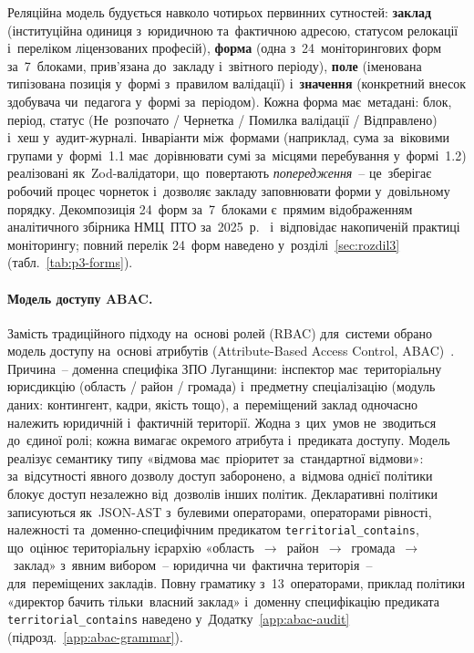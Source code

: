 Реляційна модель будується навколо чотирьох первинних сутностей: \textbf{заклад} (інституційна одиниця з~юридичною та~фактичною адресою, статусом релокації і~переліком ліцензованих професій), \textbf{форма} (одна з~24~моніторингових форм за~7~блоками, прив'язана до~закладу і~звітного періоду), \textbf{поле} (іменована типізована позиція у~формі з~правилом валідації) і~\textbf{значення} (конкретний внесок здобувача чи~педагога у~формі за~періодом). Кожна форма має~метадані: блок, період, статус (Не~розпочато / Чернетка / Помилка валідації / Відправлено) і~хеш у~аудит-журналі. Інваріанти між~формами (наприклад, сума за~віковими групами у~формі~1.1 має~дорівнювати сумі за~місцями перебування у~формі~1.2) реалізовані як~Zod-валідатори, що~повертають \emph{попередження}~-- це~зберігає робочий процес чорнеток і~дозволяє закладу заповнювати форми у~довільному порядку. Декомпозиція 24~форм за~7~блоками є~прямим відображенням аналітичного збірника НМЦ~ПТО за~2025~р.~\cite{NMTsPTO2025} і~відповідає накопиченій практиці моніторингу; повний перелік 24~форм наведено у~розділі~\ref{sec:rozdil3} (табл.~\ref{tab:p3-forms}).

\paragraph*{\textbf{Модель доступу ABAC.}}
\label{sec:p2-arch-abac}

Замість традиційного підходу на~основі ролей (RBAC) для~системи обрано модель доступу на~основі атрибутів (Attribute-Based Access Control, ABAC)~\cite{ABAC2019Encyclopedia, Ferraiolo2018ABAC}. Причина~-- доменна специфіка ЗПО Луганщини: інспектор має~територіальну юрисдикцію (область / район / громада) і~предметну спеціалізацію (модуль даних: контингент, кадри, якість тощо), а~переміщений заклад одночасно належить юридичній і~фактичній території. Жодна з~цих~умов не~зводиться до~єдиної ролі; кожна вимагає окремого атрибута і~предиката доступу. Модель реалізує семантику типу «відмова має~пріоритет за~стандартної відмови»: за~відсутності явного дозволу доступ заборонено, а~відмова однієї політики блокує доступ незалежно від~дозволів інших політик. Декларативні політики записуються як~JSON-AST з~булевими операторами, операторами рівності, належності та~доменно-специфічним предикатом \texttt{territorial\_contains}, що~оцінює територіальну ієрархію «область~$\to$~район~$\to$~громада~$\to$~заклад» з~явним вибором~-- юридична чи~фактична територія~-- для~переміщених закладів. Повну граматику з~13~операторами, приклад політики «директор бачить тільки~власний заклад» і~доменну специфікацію предиката \texttt{territorial\_contains} наведено у~Додатку~\ref{app:abac-audit} (підрозд.~\ref{app:abac-grammar}).

